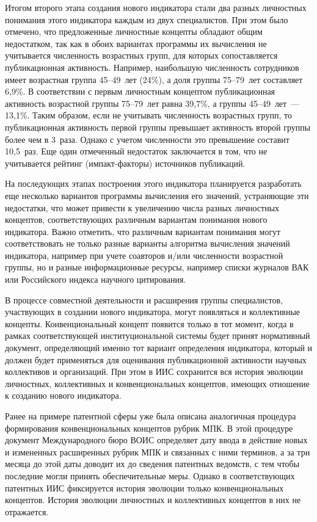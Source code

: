 \begin{multicols}{2}
   Итогом второго этапа создания нового индикатора стали два разных личностных
понимания этого индикатора каждым из двух специалистов. При этом было отмечено, что
предложенные личностные концепты обладают общим недостатком, так как в обоих
вариантах программы их вычисления не учитывается численность возрастных групп, для
которых сопоставляется публикационная активность. Например, наибольшую численность
сотрудников имеет возрастная группа 45--49~лет (24\%), а доля группы 75--79~лет
составляет 6,9\%. В соответствии с первым личностным концептом публикационная
активность возрастной группы 75--79~лет равна 39,7\%, а группы 45--49~лет~--- 13,1\%.
Таким образом, если не учитывать численность возрастных групп, то публикационная
активность первой группы превышает активность второй группы более чем в 3~раза. Однако
с учетом численности это превышение составит 10,5~раз. Еще один отмеченный недостаток
заключается в том, что не учитывается рейтинг (импакт-факторы) источников публикаций.

   На последующих этапах построения этого индикатора планируется разработать еще
несколько вариантов программы вычисления его значений, устраняющие эти недостатки, что
может привести
к увеличению числа разных личностных концептов, соответствующих
различным вариантам понимания нового индикатора. Важно отметить, что %
различным
вариантам понимания могут соответствовать не только разные варианты алгоритма %
вы\-чис\-ле\-ния значений индикатора, например при учете соавторов и/или численности
возрастной группы, но и разные информационные ресурсы, например списки журналов ВАК
или Российского индекса научного цитирования.

   В процессе совместной деятельности и расширения группы специалистов, участвующих в
создании нового индикатора, могут появляться и коллек\-тив\-ные концепты.
Конвенциональный %
концепт появится только в тот момент, когда в рамках соответствующей
институциональной системы будет принят нормативный документ, опре\-де\-ля\-ющий именно
тот вариант определения индикатора, который и должен будет применяться для оценивания
публикационной активности научных коллективов и организаций. При этом в ИИС
сохранится вся история эволюции личностных, коллективных и конвенциональных
концептов, име\-ющих отношение к созданию нового индикатора.

   Ранее на примере патентной сферы уже была описана аналогичная процедура
формирования конвенциональных концептов рубрик МПК. В этой процедуре документ
Международного бюро ВОИС определяет дату ввода в действие новых и измененных
расширенных рубрик МПК и связанных с ними терминов, а за три месяца до этой даты
доводит их до сведения патентных ведомств, с тем чтобы последние могли принять
обеспечительные меры. Однако в соответствующих патентных ИИС фиксируется история
эволюции только конвенциональных концептов. История эволюции личностных и
коллективных концептов в них не отражается.


\end{multicols}
